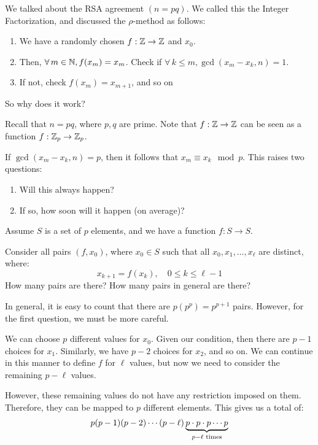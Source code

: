 \documentclass{article}
\begin{document}

We talked about the RSA agreement $ (n = pq) $.
We called this the Integer Factorization, and discussed the $ \rho $-method as follows:
 \begin{enumerate}
    \item We have a randomly chosen $ f: \mathbb{Z} \rightarrow \mathbb{Z} $ and $ x_{0} $.
    \item Then, $ \forall \, m \in \mathbb{N}, f(x_{m}) = x_{m} $.
        Check if $ \forall \, k \leq m, \gcd(x_{m}-x_{k}, n) = 1 $.
    \item If not, check $ f(x_{m}) = x_{m+1} $, and so on
\end{enumerate}
So why does it work?

Recall that $ n = pq $, where $ p, q $ are prime.
Note that $ f: \mathbb{Z} \rightarrow \mathbb{Z} $ can be seen as
a function $ f: \mathbb{Z}_{p} \rightarrow \mathbb{Z}_{p} $.

If $ \gcd(x_{m}-x_{k}, n) = p $, then it follows that $ x_{m} \equiv x_{k} \mod p $.
This raises two questions:
 \begin{enumerate}
    \item Will this always happen?
    \item If so, how soon will it happen (on average)?
\end{enumerate}

Assume $ S $ is a set of $ p $ elements, and we have a function $ f: S \rightarrow S $.

Consider all pairs $ (f, x_{0}) $, where $ x_{0} \in S $ such that
all $ x_{0}, x_{1}, \dots, x_{\ell} $ are distinct, where:
\begin{equation*}
    x_{k+1} = f(x_{k}) , \quad 0 \leq k \leq \ell-1
\end{equation*}
How many pairs are there? How many pairs in general are there?

In general, it is easy to count that there are $ p(p^{p}) = p^{p+1} $ pairs.
However, for the first question, we must be more careful.

We can choose $ p $ different values for $ x_{0} $.
Given our condition, then there are $ p-1 $ choices for $ x_{1} $.
Similarly, we have $ p-2 $ choices for $ x_{2} $, and so on.
We can continue in this manner to define $ f $ for $ \ell $ values,
but now we need to consider the remaining $ p-\ell $ values.

However, these remaining values do not have any restriction imposed on them.
Therefore, they can be mapped to $ p $ different elements.
This gives us a total of:
\begin{equation*}
    p(p-1)(p-2)\cdots(p-\ell)\underbrace{p\cdot p\cdot p \cdots p}_{p-\ell \textrm{ times}}
\end{equation*}
\end{document}

